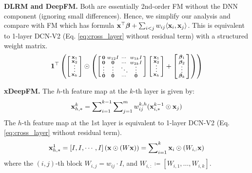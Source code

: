 \documentclass[sigconf]{acmart}
\newcommand{\vecx}{{\bf x}}
\newcommand{\vecbeta}{{\bm \beta}}
\newcommand{\veczero}{{\bf 0}}
\begin{document}
{\bf DLRM and DeepFM.} Both are essentially 2nd-order FM without the DNN component (ignoring small differences). Hence, we simplify our analysis and compare with FM which has formula
$\vecx^\top \vecbeta + \sum_{i<j} w_{ij} \langle \vecx_i, \vecx_j \rangle$.
This is equivalent to 1-layer {DCN-V2} (Eq. \eqref{eq:cross_layer} without residual term) with a structured weight matrix.
\begin{equation*}
\label{eq:dcn-fm}
\begin{split}
\mathbf{1}^\top \left(
    \left[\begin{smallmatrix}
        \vecx_1 \\
        \vecx_2 \vspace{-1ex}\\
        \vdots  \\
        \vecx_k
    \end{smallmatrix}\right]
    \odot
    \left(
    \left[\begin{smallmatrix}
        \veczero & w_{12} I & \cdots & w_{1k}I \\
        \veczero & \veczero & \cdots & w_{2k} I \vspace{-1ex}\\
        \vdots  & \vdots  & \ddots & \vdots  \\
        \veczero & \veczero & \cdots & \veczero
    \end{smallmatrix}\right]
    \left[\begin{smallmatrix}
        \vecx_1 \\
        \vecx_2 \vspace{-1ex}\\
        \vdots  \\
        \vecx_k
    \end{smallmatrix}\right]
    +
    \left[\begin{smallmatrix}
        \vecbeta_1 \\
        \vecbeta_2 \vspace{-1ex}\\
        \vdots  \\
        \vecbeta_k
    \end{smallmatrix}\right]
    \right)
    \right)
\end{split}
\end{equation*}


{\bf xDeepFM.} The $h$-th feature map at the $k$-th layer is given by:
\begin{equation*}
\label{eq:xdeepfm}
    \vecx_{h, *}^k = \sum\nolimits_{i=1}^{k-1} \sum\nolimits_{j=1}^m w_{ij}^{k, h} (\vecx_{i, *}^{k-1} \odot \vecx_j)
\end{equation*}
The $h$-th feature map at the 1st layer is equivalent to 1-layer {DCN-V2} (Eq. \eqref{eq:cross_layer} without residual term).
\begin{equation*}
\label{eq:dcn-fm2}
  \vecx_{h, *}^1 = [I, I, \cdots, I]\left(\vecx \odot (W\vecx)\right) = \sum\nolimits_{i=1}^k \vecx_i \odot (W_{i,:} \vecx)
\end{equation*}
where the $(i,j)$-th block $W_{i,j} = w_{ij} \cdot I$, and $W_{i,:} \coloneqq [W_{i,1}, \ldots, W_{i,k}]$. 
\end{document}
